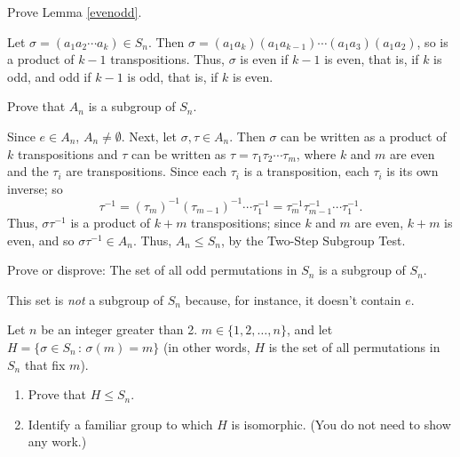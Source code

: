 \begin{exercise}
Prove Lemma \ref{evenodd}.
\end{exercise}

\begin{solution}[print=true]
Let $\sigma=(a_1a_2\cdots a_k)\in S_n$.  Then $\sigma=(a_1a_k)(a_1a_{k-1})\cdots (a_1a_3)(a_1a_2)$, so is a product of $k-1$ transpositions.  Thus, $\sigma$ is even if $k-1$ is even, that is, if $k$ is odd, and odd if $k-1$ is odd, that is, if $k$ is even.
\end{solution}

\begin{exercise}
Prove that $A_n$ is a subgroup of $S_n$.
\end{exercise}

\begin{solution}[print=true]
Since $e\in A_n$, $A_n\neq \emptyset$.  Next, let $\sigma, \tau \in A_n$.  Then $\sigma$ can be written as a product of $k$ transpositions and $\tau$ can be written as $\tau=\tau_1\tau_2\cdots \tau_m$, where $k$ and $m$ are even and the $\tau_i$ are transpositions. Since each $\tau_i$ is a transposition, each $\tau_i$ is its own inverse; so $$\tau^{-1}=(\tau_m)^{-1}(\tau_{m-1})^{-1}\cdots \tau_1^{-1}=\tau_m^{-1}\tau_{m-1}^{-1}\cdots \tau_1^{-1}.$$ Thus, $\sigma \tau^{-1}$ is a product of $k+m$ transpositions; since $k$ and $m$ are even, $k+m$ is even, and so $\sigma \tau^{-1}\in A_n$.  Thus, $A_n\leq S_n$, by the Two-Step Subgroup Test.
\end{solution}

\begin{exercise} Prove or disprove: The set of all odd permutations in $S_n$ is a subgroup of $S_n$.
\end{exercise}

\begin{solution}[print=true]
This set is \textit{not} a subgroup of $S_n$ because, for instance, it doesn't contain $e$.
\end{solution}

\begin{exercise}
Let $n$ be an integer greater than 2. $m \in \{1,2,\ldots,n\}$, and let $H=\{\sigma\in S_n\,:\,\sigma(m)=m\}$ (in other words, $H$ is the set of all permutations in $S_n$ that fix $m$).

\begin{enumerate}
\item Prove that $H\leq S_n$.
\item Identify a familiar group to which $H$ is isomorphic. (You do not need to show any work.)
\end{enumerate}
\end{exercise}

